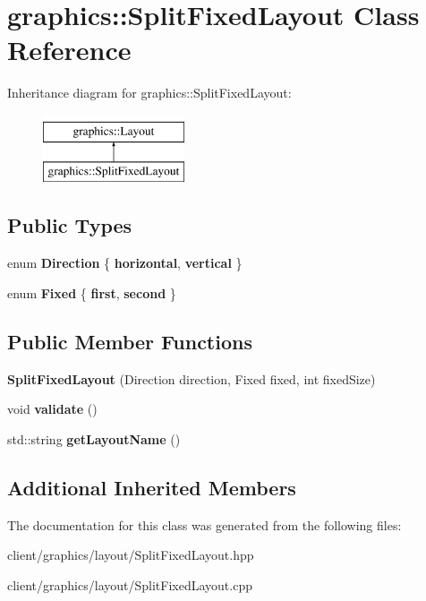 \hypertarget{classgraphics_1_1_split_fixed_layout}{\section{graphics\-:\-:Split\-Fixed\-Layout Class Reference}
\label{classgraphics_1_1_split_fixed_layout}
}
Inheritance diagram for graphics\-:\-:Split\-Fixed\-Layout\-:\begin{figure}[H]
\begin{center}
\leavevmode
\includegraphics[height=2.000000cm]{classgraphics_1_1_split_fixed_layout}
\end{center}
\end{figure}
\subsection*{Public Types}
\begin{DoxyCompactItemize}
\item 
enum {\bfseries Direction} \{ {\bfseries horizontal}, 
{\bfseries vertical}
 \}
\item 
enum {\bfseries Fixed} \{ {\bfseries first}, 
{\bfseries second}
 \}
\end{DoxyCompactItemize}
\subsection*{Public Member Functions}
\begin{DoxyCompactItemize}
\item 
\hypertarget{classgraphics_1_1_split_fixed_layout_a2232c51009eb9ca8f6596edcfa823861}{{\bfseries Split\-Fixed\-Layout} (Direction direction, Fixed fixed, int fixed\-Size)}\label{classgraphics_1_1_split_fixed_layout_a2232c51009eb9ca8f6596edcfa823861}

\item 
\hypertarget{classgraphics_1_1_split_fixed_layout_a3d4b45bf2edf37ea673abf9fb680cbca}{void {\bfseries validate} ()}\label{classgraphics_1_1_split_fixed_layout_a3d4b45bf2edf37ea673abf9fb680cbca}

\item 
\hypertarget{classgraphics_1_1_split_fixed_layout_aff9f570b27cec8b41de027e208f85802}{std\-::string {\bfseries get\-Layout\-Name} ()}\label{classgraphics_1_1_split_fixed_layout_aff9f570b27cec8b41de027e208f85802}

\end{DoxyCompactItemize}
\subsection*{Additional Inherited Members}


The documentation for this class was generated from the following files\-:\begin{DoxyCompactItemize}
\item 
client/graphics/layout/Split\-Fixed\-Layout.\-hpp\item 
client/graphics/layout/Split\-Fixed\-Layout.\-cpp\end{DoxyCompactItemize}
